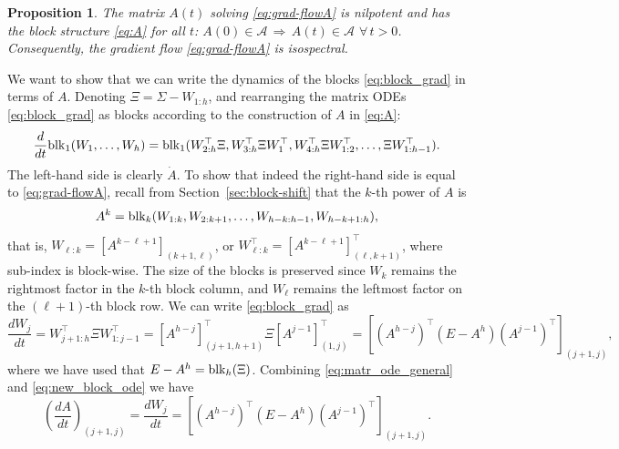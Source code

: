\documentclass{article}
\makeatletter
\renewenvironment{proof}[1][\proofname]{
  \par\pushQED{\qed}\normalfont
  \topsep6\p@\@plus6\p@\relax
  \trivlist\item[\hskip\labelsep\bfseries#1\@addpunct{.}]
  \ignorespaces
}{
  \popQED\endtrivlist\@endpefalse
}
\newtheorem{proposition}{Proposition}
\def\block{{\rm blk}}
\newcommand{\1}{\mathds{1}}
\makeatother
\begin{document}
\begin{proposition}
\label{prop:A-block-struct}
The matrix $A(t)$ solving \eqref{eq:grad-flowA} is nilpotent and has the block structure \eqref{eq:A} for all $t$: $ A(0)\in \mathcal{A} \,\Longrightarrow \, A(t) \in \mathcal{A}$ $ \forall \, t>0$. Consequently, the gradient flow \eqref{eq:grad-flowA} is isospectral.
\end{proposition}

\begin{proof}
We want to show that we can write the dynamics of the blocks \eqref{eq:block_grad} in terms of $A$. Denoting $\Xi=\Sigma-W_{1:h}$, and rearranging the matrix ODEs \eqref{eq:block_grad} as blocks according to the construction of $A$ in \eqref{eq:A}:
\begin{equation}\label{eq:matr_ode_general}
\begin{split}
\frac{d}{dt} \block_1(W_1, \ldots, W_h) 
 = \block_1(W_{2:h}^\top \Xi,W_{3:h}^\top \Xi W_1^\top , W_{4:h}^\top \Xi W_{1:2}^\top,  \ldots ,  \Xi W_{1:h-1}^\top ). \\ 
\end{split}
\end{equation}
The left-hand side is clearly $ \dot A$. 
To show that indeed the right-hand side is equal to \eqref{eq:grad-flowA}, recall from Section~\ref{sec:block-shift} that the $ k$-th power of $A$ is 
\begin{equation}
    \label{eq:Apowerk}
	A^k=\block_k (W_{1:k}, W_{2:k+1}, \ldots , W_{h-k:h-1}, W_{h-k+1:h}) ,
\end{equation}
that is, $W_{\ell:k}=[A^{k-\ell+1}]_{(k+1,\ell)}$, or $W_{\ell:k}^\top=[A^{k-\ell+1}]^\top_{(\ell,k+1)}$, where sub-index is block-wise. The size of the blocks is preserved since $W_k$ remains the rightmost factor in the $k$-th block column, and $W_\ell$ remains the leftmost factor on the $(\ell+1)$-th block row. 
We can write \eqref{eq:block_grad} as
\begin{equation}\label{eq:new_block_ode}
	\frac{dW_j}{dt} = W_{j+1:h}^\top \Xi W_{1:j-1}^\top = [A^{h-j}]^\top_{(j+1,h+1)} \Xi  [A^{j-1}]^\top_{(1,j)} = \left[(A^{h-j})^\top (E - A^{h}) (A^{j-1})^\top\right]_{(j+1,j)},
\end{equation}
where we have used that $ E - A^h = \block_h(\Xi)$.
Combining \eqref{eq:matr_ode_general} and \eqref{eq:new_block_ode} we have
\begin{equation*}
	\left(\frac{dA}{dt}\right)_{(j+1,j)} = \frac{dW_j}{dt} = \left[(A^{h-j})^\top (E - A^{h}) (A^{j-1})^\top\right]_{(j+1,j)}.
\end{equation*}

\end{proof}
\end{document}
